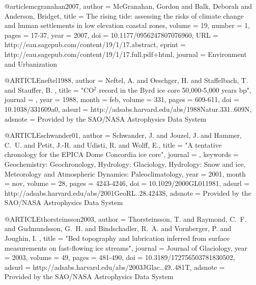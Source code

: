 @article{mcgranahan2007,
author = {McGranahan, Gordon and Balk, Deborah and Anderson, Bridget}, 
title = {The rising tide: assessing the risks of climate change and human settlements in low elevation coastal zones}, 
volume = {19}, 
number = {1}, 
pages = {17-37}, 
year = {2007}, 
doi = {10.1177/0956247807076960}, 
URL = {http://eau.sagepub.com/content/19/1/17.abstract}, 
eprint = {http://eau.sagepub.com/content/19/1/17.full.pdf+html}, 
journal = {Environment and Urbanization} 
}

@ARTICLE{neftel1988,
   author = {{Neftel}, A. and {Oeschger}, H. and {Staffelbach}, T. and {Stauffer}, B.
	},
    title = "{CO$^{2}$ record in the Byrd ice core 50,000-5,000 years bp}",
  journal = {\nat},
     year = 1988,
    month = feb,
   volume = 331,
    pages = {609-611},
      doi = {10.1038/331609a0},
   adsurl = {http://adsabs.harvard.edu/abs/1988Natur.331..609N},
  adsnote = {Provided by the SAO/NASA Astrophysics Data System}
}

@ARTICLE{schwander01,
   author = {{Schwander}, J. and {Jouzel}, J. and {Hammer}, C.~U. and {Petit}, J.-R. and 
	{Udisti}, R. and {Wolff}, E.},
    title = "{A tentative chronology for the EPICA Dome Concordia ice core}",
  journal = {\grl},
 keywords = {Geochemistry: Geochronology, Hydrology: Glaciology, Hydrology: Snow and ice, Meteorology and Atmospheric Dynamics: Paleoclimatology},
     year = 2001,
    month = nov,
   volume = 28,
    pages = {4243-4246},
      doi = {10.1029/2000GL011981},
   adsurl = {http://adsabs.harvard.edu/abs/2001GeoRL..28.4243S},
  adsnote = {Provided by the SAO/NASA Astrophysics Data System}
}

@ARTICLE{thorsteinsson2003,
   author = {{Thorsteinsson}, T. and {Raymond}, C.~F. and {Gudmundsson}, G.~H. and 
	{Bindschadler}, R.~A. and {Vornberger}, P. and {Joughin}, I.
	},
    title = "{Bed topography and lubrication inferred from surface measurements on fast-flowing ice streams}",
  journal = {Journal of Glaciology},
     year = 2003,
   volume = 49,
    pages = {481-490},
      doi = {10.3189/172756503781830502},
   adsurl = {http://adsabs.harvard.edu/abs/2003JGlac..49..481T},
  adsnote = {Provided by the SAO/NASA Astrophysics Data System}
}